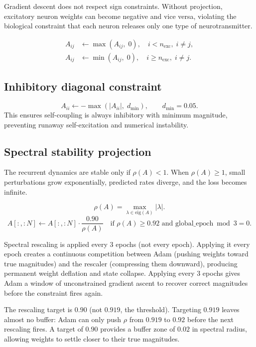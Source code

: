 \documentclass[11pt]{article}
\begin{document}
Gradient descent does not respect sign constraints.  Without projection, excitatory
neuron weights can become negative and vice versa, violating the biological constraint
that each neuron releases only one type of neurotransmitter.

\begin{align}
  A_{ij} &\leftarrow \max(A_{ij},\;0), \quad i < n_{\mathrm{exc}},\;i\neq j,\\
  A_{ij} &\leftarrow \min(A_{ij},\;0), \quad i \ge n_{\mathrm{exc}},\;i\neq j.
\end{align}

\subsection{Inhibitory diagonal constraint}

\begin{equation}
  A_{ii} \leftarrow -\max(|A_{ii}|,\;d_{\min}),\qquad d_{\min}=0.05.
\end{equation}
This ensures self-coupling is always inhibitory with minimum magnitude, preventing
runaway self-excitation and numerical instability.

\subsection{Spectral stability projection}

The recurrent dynamics are stable only if $\rho(A) < 1$.  When $\rho(A) \ge 1$,
small perturbations grow exponentially, predicted rates diverge, and the loss
becomes infinite.

\begin{equation}
  \rho(A) = \max_{\lambda\in\mathrm{eig}(A)}|\lambda|.
\end{equation}
\begin{equation}
  A[:, :N] \leftarrow A[:, :N]\cdot\frac{0.90}{\rho(A)}\quad
  \text{if }\rho(A)\ge 0.92\text{ and global\_epoch} \bmod 3 = 0.
\end{equation}

Spectral rescaling is applied every 3 epochs (not every epoch).  Applying it every
epoch creates a continuous competition between Adam (pushing weights toward true
magnitudes) and the rescaler (compressing them downward), producing permanent weight
deflation and state collapse.  Applying every 3 epochs gives Adam a window of
unconstrained gradient ascent to recover correct magnitudes before the constraint
fires again.

The rescaling target is $0.90$ (not $0.919$, the threshold).  Targeting $0.919$
leaves almost no buffer: Adam can only push $\rho$ from $0.919$ to $0.92$ before the
next rescaling fires.  A target of $0.90$ provides a buffer zone of $0.02$ in
spectral radius, allowing weights to settle closer to their true magnitudes.
\end{document}
